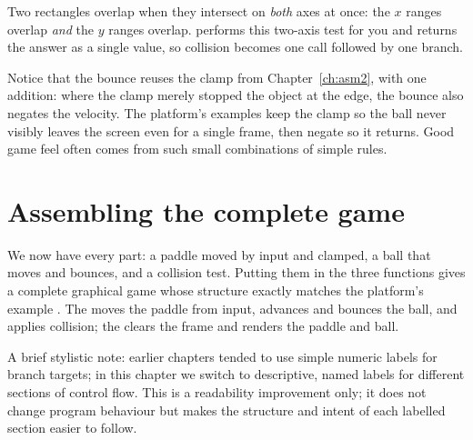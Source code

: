 

Two rectangles overlap when they intersect on \emph{both} axes at once: the $x$
ranges overlap \emph{and} the $y$ ranges overlap. 
performs this two-axis test for you and returns the answer as a single value, so
collision becomes one call followed by one branch.

\begin{prgconcept}
Notice that the bounce reuses the clamp from Chapter~\ref{ch:asm2}, with one
addition: where the clamp merely stopped the object at the edge, the bounce also
negates the velocity. The platform's examples keep the clamp so the ball never
visibly leaves the screen even for a single frame, then negate so it returns. Good
game feel often comes from such small combinations of simple rules.
\end{prgconcept}

\section{Assembling the complete game}

We now have every part: a paddle moved by input and clamped, a ball that moves
and bounces, and a collision test. Putting them in the three functions gives a
complete graphical game whose structure exactly matches the platform's
 example \citep{prg32repo}. The  moves the 
paddle from input,  advances and bounces the ball, and applies collision; 
the  clears the frame and renders the paddle and ball.



A brief stylistic note: earlier chapters tended to use simple numeric 
labels for branch targets; in this chapter we switch to descriptive, 
named labels for different sections of control flow. This is a readability 
improvement only; it does not change program behaviour but makes the 
structure and intent of each labelled section easier to follow.

